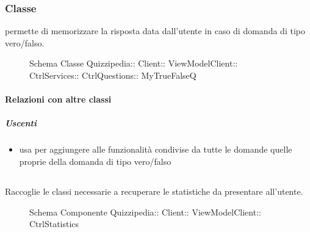 \subsubsection{Classe }
permette di memorizzare la risposta data dall'utente in caso di domanda di tipo vero/falso.
\begin{figure}[H]
\centering
\noindent{}
\caption[Schema Classe MyTrueFalseQ]{Schema Classe Quizzipedia:: Client:: ViewModelClient:: CtrlServices:: CtrlQuestions:: MyTrueFalseQ}
\end{figure}
\paragraph{Relazioni con altre classi}
\subparagraph{Uscenti}
\begin{itemize}
\item usa  per aggiungere alle funzionalità condivise da tutte le domande quelle proprie della domanda di tipo vero/falso
\end{itemize}
\subsection{}
Raccoglie le classi necessarie a recuperare le statistiche da presentare all'utente.
\begin{figure}[H]
\centering
\noindent{}
\caption[Schema Componente CtrlStatistics]{Schema Componente Quizzipedia:: Client:: ViewModelClient:: CtrlStatistics}
\end{figure}
